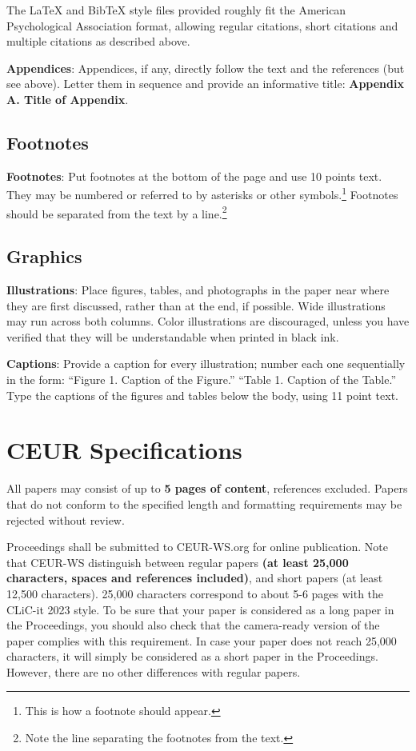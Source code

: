 \documentclass[11pt]{article}
\begin{document}
The \LaTeX{} and Bib\TeX{} style files provided roughly fit the
American Psychological Association format, allowing regular citations, 
short citations and multiple citations as described above.

{\bf Appendices}: Appendices, if any, directly follow the text and the
references (but see above).  Letter them in sequence and provide an
informative title: {\bf Appendix A. Title of Appendix}.

\subsection{Footnotes}

{\bf Footnotes}: Put footnotes at the bottom of the page and use 10
points text. They may be numbered or referred to by asterisks or other
symbols.\footnote{This is how a footnote should appear.} Footnotes
should be separated from the text by a line.\footnote{Note the line
separating the footnotes from the text.}

\subsection{Graphics}

{\bf Illustrations}: Place figures, tables, and photographs in the
paper near where they are first discussed, rather than at the end, if
possible.  Wide illustrations may run across both columns.  Color
illustrations are discouraged, unless you have verified that  
they will be understandable when printed in black ink.

{\bf Captions}: Provide a caption for every illustration; number each one
sequentially in the form:  ``Figure 1. Caption of the Figure.'' ``Table 1.
Caption of the Table.''  Type the captions of the figures and 
tables below the body, using 11 point text.

\section{CEUR Specifications}
\label{sec:ceur-specs}

All papers may consist of up to {\bf 5 pages of content}, references excluded.  Papers that do not conform to the specified length and formatting requirements may be
rejected without review.

Proceedings shall be submitted to CEUR-WS.org for online publication. Note that CEUR-WS distinguish between regular papers \textbf{(at least 25,000 characters, spaces and references included)}, and short papers (at least 12,500 characters). 
25,000 characters correspond to about 5-6 pages with the CLiC-it 2023 style.
To be sure that your paper is considered as a long paper in the Proceedings, you should also check that the camera-ready version of the paper complies with this requirement. In case your paper does not reach 25,000 characters, it will simply be considered as a short paper in the Proceedings. However, there are no other differences with regular papers.
\end{document}
